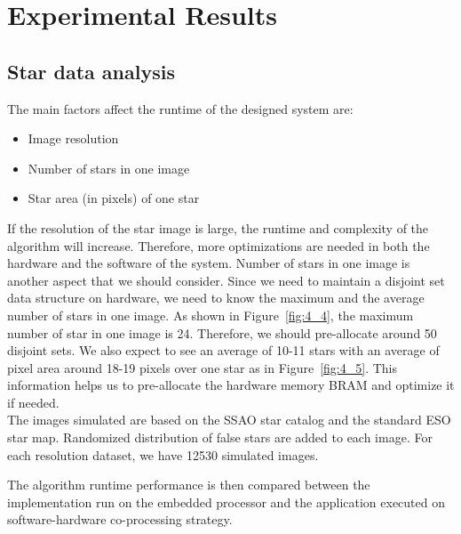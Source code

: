 \chapter{Experimental Results}
\label{chap:result}

\section{Star data analysis}

\noindent The main factors affect the runtime of the designed system are:
\begin{itemize}
    \item Image resolution
    \item Number of stars in one image
    \item Star area (in pixels) of one star
\end{itemize}

\noindent If the resolution of the star image is large, the runtime and complexity of the algorithm will increase. Therefore, more optimizations are needed in both the hardware and the software of the system. Number of stars in one image is another aspect that we should consider. Since we need to maintain a disjoint set data structure on hardware, we need to know the maximum and the average number of stars in one image. As shown in Figure~\ref{fig:4_4}, the maximum number of star in one image is 24. Therefore, we should pre-allocate around 50 disjoint sets. We also expect to see an average of 10-11 stars with an average of pixel area around 18-19 pixels over one star as in Figure~\ref{fig:4_5}. This information helps us to pre-allocate the hardware memory BRAM and optimize it if needed. \\  

\noindent The images simulated are based on the SSAO star catalog and the standard ESO star map. Randomized distribution of false stars are added to each image. For each resolution dataset, we have 12530 simulated images. \\



\noindent The algorithm runtime performance is then compared between the implementation run on the embedded processor and the application executed on software-hardware co-processing strategy.

